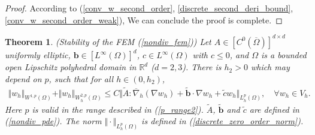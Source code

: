\documentclass[12pt]{amsart}
\newtheorem{theorem}{Theorem}[section]
\theoremstyle{definition}
\theoremstyle{remark}
\begin{document}
\begin{proof}
According to (\ref{conv_w_second_order}, \ref{discrete_second_deri_bound}, 
\ref{conv_w_second_order_weak}), We can conclude the proof is complete.
\end{proof}

\begin{theorem}
\label{thm_global_estimate}
(Stability of the FEM (\ref{nondiv_fem})) 
Let $A \in [C^{0}(\overline{\Omega})]^{d\times d}$ uniformly elliptic, $\boldsymbol{b}\in 
[L^{\infty}(\Omega)]^{d}$, $c \in L^{\infty}(\Omega)$ with $c \leq 0$, 
 and $\Omega$ is a bounded open Lipschitz polyhedral domain in $\mathbb{R}^{d}$ ($d=2,3$).  
There is $h_{2} > 0$ which may depend on $p$, such that for all $h \in (0, h_{2})$,
\begin{align}
\label{global_estimate}
\Vert w_{h}\Vert_{W^{1,p}(\Omega)} + \Vert w_{h} \Vert_{W_{h}^{2,p}(\Omega)} 
\leq C \Vert \tilde{A}: \overline{\nabla}_{h}(\nabla w_{h}) +\tilde{\boldsymbol{b}}\cdot\nabla w_{h} 
+ \tilde{c} w_{h}\Vert_{L_{h}^{p}(\Omega)}, \quad \forall w_{h} \in V_{h}.
\end{align}
Here $p$ is valid in the range described in (\ref{p_range2}). 
$\tilde{A}$, $\tilde{\boldsymbol{b}}$ and $\tilde{c}$ are defined in (\ref{nondiv_pde}). 
The norm $\Vert \cdot \Vert_{L_{h}^{p}(\Omega)}$ is defined in (\ref{discrete_zero_order_norm}).
\end{theorem}
\end{document}

